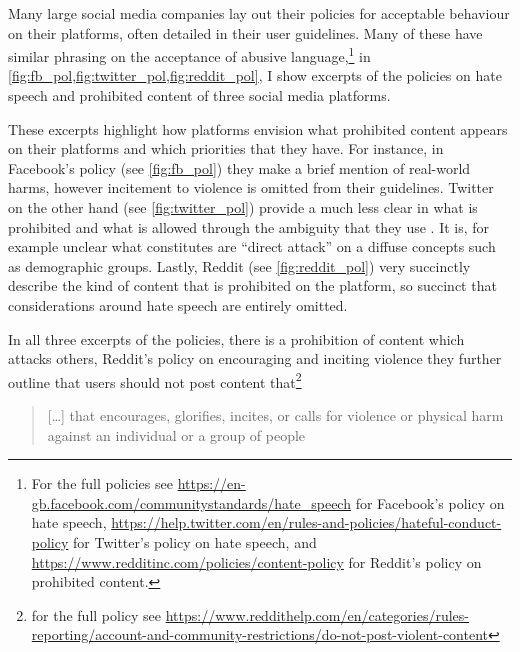 Many large social media companies lay out their policies for acceptable behaviour on their platforms, often detailed in their user guidelines.
Many of these have similar phrasing on the acceptance of abusive language,\footnote{For the full policies see \url{https://en-gb.facebook.com/communitystandards/hate_speech} for Facebook's policy on hate speech, \url{https://help.twitter.com/en/rules-and-policies/hateful-conduct-policy} for Twitter's policy on hate speech, and \url{https://www.redditinc.com/policies/content-policy} for Reddit's policy on prohibited content.} in \cref{fig:fb_pol,fig:twitter_pol,fig:reddit_pol}, I show excerpts of the policies on hate speech and prohibited content of three social media platforms.

These excerpts highlight how platforms envision what prohibited content appears on their platforms and which priorities that they have.
For instance, in Facebook's policy (see \cref{fig:fb_pol}) they make a brief mention of real-world harms, however incitement to violence is omitted from their guidelines.
Twitter on the other hand (see \cref{fig:twitter_pol}) provide a much less clear in what is prohibited and what is allowed through the ambiguity that they use \citep{Kirtz:2022}.
It is, for example unclear what constitutes are ``direct attack'' on a diffuse concepts such as demographic groups.
Lastly, Reddit (see \cref{fig:reddit_pol}) very succinctly describe the kind of content that is prohibited on the platform, so succinct that considerations around hate speech are entirely omitted.

In all three excerpts of the policies, there is a prohibition of content which attacks others, Reddit's policy on encouraging and inciting violence they further outline that users should not post content that\footnote{for the full policy see \url{https://www.reddithelp.com/en/categories/rules-reporting/account-and-community-restrictions/do-not-post-violent-content}}

\begin{quote}
  [\dots] that encourages, glorifies, incites, or calls for violence or physical harm against an individual or a group of people
\end{quote}

